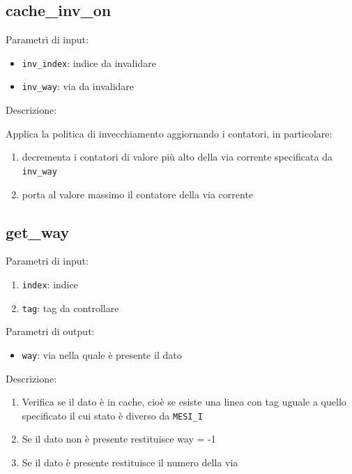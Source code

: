 \subsection{cache\_inv\_on} %

Parametri di input:
\begin{itemize}
  \item \texttt{inv\_index}: indice da invalidare
  \item \texttt{inv\_way}: via da invalidare
\end{itemize}

Descrizione:

Applica la politica di invecchiamento aggiornando i contatori, in particolare:
\begin{enumerate}
  \item decrementa i contatori di valore pi\`u alto della via corrente specificata da \texttt{inv\_way}
  \item porta al valore massimo il contatore della via corrente
\end{enumerate}	
	

\subsection{get\_way} %

Parametri di input:
\begin{enumerate}
  \item \texttt{index}: indice
  \item \texttt{tag}: tag da controllare
\end{enumerate}	

Parametri di output:
\begin{itemize}
  \item \texttt{way}: via nella quale \`e presente il dato
\end{itemize}

Descrizione:	
\begin{enumerate}
  \item Verifica se il dato \`e in cache, cio\`e se esiste una linea con tag uguale a quello specificato il cui stato \`e diverso da \texttt{MESI\_I}
  \item Se il dato non \`e presente restituisce way = -1
  \item Se il dato \`e presente restituisce il numero della via
\end{enumerate}
	
	
	
